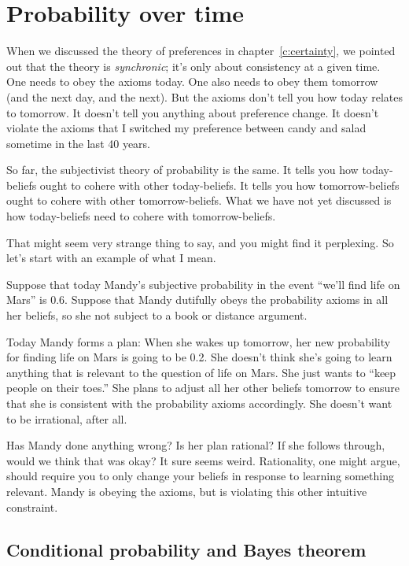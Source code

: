 \chapter{Probability over time}

When we discussed the theory of preferences in chapter~\ref{c:certainty}, we pointed out that the theory is {\it synchronic}; it's only about consistency at a given time.  One needs to obey the axioms today. One also needs to obey them tomorrow (and the next day, and the next).  But the axioms don't tell you how today relates to tomorrow. It doesn't tell you anything about preference change.  It doesn't violate the axioms that I switched my preference between candy and salad sometime in the last 40 years.

So far, the subjectivist theory of probability is the same.  It tells you how today-beliefs ought to cohere with other today-beliefs. It tells you how tomorrow-beliefs ought to cohere with other tomorrow-beliefs. What we have not yet discussed is how today-beliefs need to cohere with tomorrow-beliefs.

That might seem very strange thing to say, and you might find it perplexing.  So let's start with an example of what I mean.

Suppose that today Mandy's subjective probability in the event ``we'll find life on Mars'' is 0.6.  Suppose that Mandy dutifully obeys the probability axioms in all her beliefs, so she not subject to a book or distance argument.

Today Mandy forms a plan: When she wakes up tomorrow, her new probability for finding life on Mars is going to be 0.2. She doesn't think she's going to learn anything that is relevant to the question of life on Mars. She just wants to ``keep people on their toes.'' She plans to adjust all her other beliefs tomorrow to ensure that she is consistent with the probability axioms accordingly. She doesn't want to be irrational, after all.

Has Mandy done anything wrong? Is her plan rational?  If she follows through, would we think that was okay?  It sure seems weird.  Rationality, one might argue, should require you to only change your beliefs in response to learning something relevant.  Mandy is obeying the axioms, but is violating this other intuitive constraint.

\section{Conditional probability and Bayes theorem}

